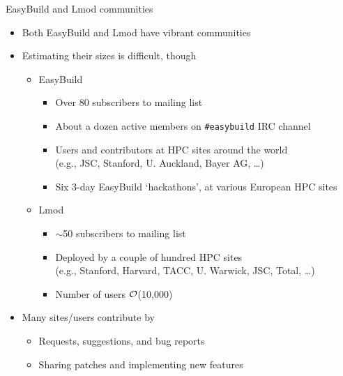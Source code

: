 \documentclass[10pt,xcolor={usenames,dvipsnames}]{beamer}
\begin{document}
\begin{frame}{EasyBuild and Lmod communities}
\begin{itemize}
    \item
        Both EasyBuild and Lmod have vibrant communities
    \item
        Estimating their sizes is difficult, though
        \begin{itemize}
            \item
                EasyBuild
                \begin{itemize}
                    \item
                        Over 80 subscribers to mailing list
                    \item
                        About a dozen active members on \texttt{\#easybuild} IRC channel
                    \item
                        Users and contributors at HPC sites around the world\\
                        (e.g., JSC, Stanford, U. Auckland, Bayer AG, \ldots)
                    \item
                        Six 3-day EasyBuild `hackathons', at various European HPC sites
                \end{itemize}
            \item
                Lmod
                \begin{itemize}
                    \item
                        $\sim$50 subscribers to mailing list
                    \item
                        Deployed by a couple of hundred HPC sites\\
                        (e.g., Stanford, Harvard, TACC, U. Warwick, JSC, Total, \ldots)
                    \item
                        Number of users $\cal{O}$(10,000)
                \end{itemize}
        \end{itemize}
    \item
        Many sites/users contribute by
        \begin{itemize}
            \item
                Requests, suggestions, and bug reports
            \item
                Sharing patches and implementing new features
        \end{itemize}
\end{itemize}
\end{frame}
\end{document}
